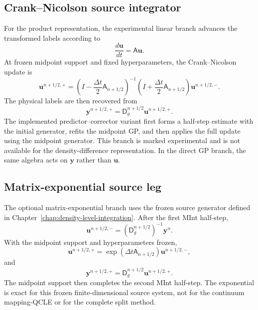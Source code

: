 \documentclass[
  11pt,
  letterpaper,
  onehalfspacing,
  normalmargins,
  equalmargins,
  oneside
]{ut-thesis}
\begin{document}
\subsection{Crank--Nicolson source integrator}
\label{appsubsec:linear-label-integrator}

For the product representation, the experimental linear branch advances the
transformed labels according to
\begin{equation}
\frac{d\mathbf u}{dt}
=
\mathsf A\mathbf u.
\label{appeq:linear-label-ode}
\end{equation}
At frozen midpoint support and fixed hyperparameters, the Crank--Nicolson
update is
\begin{equation}
\mathbf u^{n+1/2,+}
=
\left(
I-\frac{\Delta t}{2}\mathsf A_{n+1/2}
\right)^{-1}
\left(
I+\frac{\Delta t}{2}\mathsf A_{n+1/2}
\right)
\mathbf u^{n+1/2,-}.
\label{appeq:crank-nicolson-label}
\end{equation}
The physical labels are then recovered from
\begin{equation}
\mathbf y^{n+1/2,+}
=
\mathsf D_g^{n+1/2}\mathbf u^{n+1/2,+}.
\label{appeq:crank-nicolson-physical-labels}
\end{equation}
The implemented predictor--corrector variant first forms a half-step estimate
with the initial generator, refits the midpoint GP, and then applies the full
update using the midpoint generator. This branch is marked experimental and
is not available for the density-difference representation. In the direct
GP branch, the same algebra acts on \(\mathbf y\) rather than \(\mathbf u\).

\subsection{Matrix-exponential source leg}
\label{appsubsec:exponential-source-leg}

The optional matrix-exponential branch uses the frozen source generator
defined in Chapter~\ref{chap:density-level-integration}. After the first MInt half-step,
\begin{equation}
\mathbf u^{n+1/2,-}
=
\left(\mathsf D_g^{n+1/2}\right)^{-1}\mathbf y^n.
\label{appeq:appendix-pre-source-u}
\end{equation}
With the midpoint support and hyperparameters frozen,
\begin{equation}
\mathbf u^{n+1/2,+}
=
\exp\left(
\Delta t\mathsf A_{n+1/2}
\right)
\mathbf u^{n+1/2,-},
\label{appeq:exponential-source-step}
\end{equation}
and
\begin{equation}
\mathbf y^{n+1/2,+}
=
\mathsf D_g^{n+1/2}\mathbf u^{n+1/2,+}.
\label{appeq:appendix-post-source-y}
\end{equation}
The midpoint support then completes the second MInt half-step. The exponential
is exact for this frozen finite-dimensional source system, not for the
continuum mapping-QCLE or for the complete split method.
\end{document}

